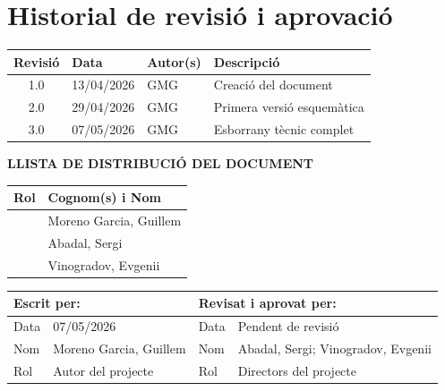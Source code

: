 \vspace*{0cm}

\chapter*{Historial de revisió i aprovació}
{}

\begin{tabularx}{\textwidth}{|c|l|l|X|}
  \hline
    \textbf{Revisió} & \textbf{Data} & \textbf{Autor(s)} & \textbf{Descripció} \\
  \hline
    1.0 & 13/04/2026 & GMG & Creació del document \\
  \hline
    2.0 & 29/04/2026 & GMG & Primera versió esquemàtica \\
  \hline
    3.0 & 07/05/2026 & GMG & Esborrany tècnic complet \\
  \hline
\end{tabularx}

\vspace{1cm}

\textbf{LLISTA DE DISTRIBUCIÓ DEL DOCUMENT}

\begin{tabularx}{\textwidth}{|l|X|}
  \hline
    \textbf{Rol} & \textbf{Cognom(s) i Nom} \\
  \hline
    [Estudiant] & Moreno Garcia, Guillem \\
  \hline
    [Director del projecte] & Abadal, Sergi \\
  \hline
    [Director 2 (si aplica)] & Vinogradov, Evgenii \\
  \hline
\end{tabularx}

\vspace{1cm}

\begin{tabularx}{\textwidth}{|l|X||l|X|}
  \hline
    \multicolumn{2}{|l||}{\textbf{Escrit per:}}  &  \multicolumn{2}{l|}{\textbf{Revisat i aprovat per:}} \\
  \hline
    Data &  07/05/2026 & Data &  Pendent de revisió \\
  \hline
    Nom &  Moreno Garcia, Guillem & Nom &  Abadal, Sergi; Vinogradov, Evgenii \\
  \hline
    Rol & Autor del projecte & Rol & Directors del projecte \\
  \hline
\end{tabularx}
